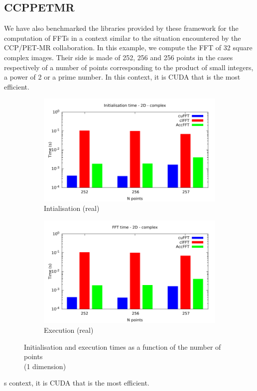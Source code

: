 \documentclass[12pt, a4paper]{article}
\begin{document}
\subsection{CCPPETMR}
We have also benchmarked the libraries provided by these framework for the computation of FFTs in a context similar to the situation encountered by the CCP/PET-MR collaboration. In this example, we compute the FFT of 32 square complex images. Their side is made of 252, 256 and 256 points in the cases respectively of a number of points corresponding to the product of small integers, a power of 2 or a prime number. In this context, it is CUDA that is the most efficient.
\begin{figure}[H]
\captionsetup{width=0.8\linewidth}
\centering
\begin{subfigure}{.5\textwidth}
\centering
\includegraphics[width=.9\linewidth]{graphs/fft-ccppetmr-init.pdf}
\caption{Intialisation (real)}
\label{FFT1DRI}
\end{subfigure}%
\begin{subfigure}{.5\textwidth}
\centering
\includegraphics[width=.9\linewidth]{graphs/fft-ccppetmr-exec.pdf}
\caption{Execution (real)}
\label{FFT1DRE}
\end{subfigure}
\caption{Initialisation and execution times as a function of the number of points\\(1 dimension)}
\label{FFT1D}
\end{figure}s context, it is CUDA that is the most efficient. 
\end{document}
